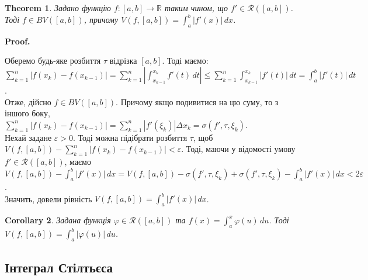 \documentclass[a4paper, 10pt]{article}
\makeatletter
\def\qed{$\blacksquare$}
\theoremstyle{theoremdd}
\newtheorem{theorem}{Theorem}[subsection]
\theoremstyle{theoremdd}
\theoremstyle{theoremdd}
\theoremstyle{theoremdd}
\theoremstyle{theoremdd}
\theoremstyle{theoremdd}
\theoremstyle{theoremdd}
\theoremstyle{theoremdd}
\theoremstyle{theoremdd}
\newtheorem{corollary}[theorem]{Corollary}
\renewenvironment{proof}[1][Proof.\\]{\par
\pushQED{\hfill \qed}%
\normalfont \topsep6\p@\@plus6\p@\relax
\trivlist
\item\relax
{\bfseries
#1\@addpunct{.}}\hspace\labelsep\ignorespaces
}{%
\popQED\endtrivlist\@endpefalse
}
\makeatother
\begin{document}
\begin{theorem}
\label{differentiable_integrable_is_bounded_variation}
Задано функцію $f \colon [a,b] \to \mathbb{R}$ таким чином, що $f' \in \mathcal{R}([a,b])$. Тоді $f \in BV([a,b])$, причому $V(f,[a,b]) = \displaystyle\int_a^b |f'(x)|\,dx$.
\end{theorem}

\begin{proof}
Оберемо будь-яке розбиття $\tau$ відрізка $[a,b]$. Тоді маємо:\\
$\displaystyle\sum_{k=1}^n |f(x_k) - f(x_{k-1})| = \sum_{k=1}^n \left|\int_{x_{k-1}}^{x_k} f'(t)\,dt \right| \leq \sum_{k=1}^n \int_{x_{k-1}}^{x_k} |f'(t)|\,dt = \int_a^b |f'(t)|\,dt$.\\
Отже, дійсно $f \in BV([a,b])$. Причому якщо подивитися на цю суму, то з іншого боку,\\
$\displaystyle\sum_{k=1}^n |f(x_k) - f(x_{k-1})| = \sum_{k=1}^n |f'(\xi_k)| \Delta x_k = \sigma(f',\tau,\xi_k)$.\\
Нехай задане $\varepsilon > 0$. Тоді можна підібрати розбиття $\tau$, щоб $V(f,[a,b]) - \displaystyle\sum_{k=1}^n |f(x_k) - f(x_{k-1})| < \varepsilon$. Тоді, маючи у відомості умову $f' \in \mathcal{R}([a,b])$, маємо\\
$V(f,[a,b]) - \displaystyle\int_a^b |f'(x)|\,dx = V(f,[a,b]) - \sigma(f',\tau,\xi_k) + \sigma(f',\tau,\xi_k) - \displaystyle\int_a^b |f'(x)|\,dx < 2\varepsilon$.\\
Значить, довели рівність $V(f,[a,b]) = \displaystyle\int_a^b |f'(x)|\,dx$.
\end{proof}

\begin{corollary}
Задана функція $\varphi \in \mathcal{R}([a,b])$ та $f(x) = \displaystyle\int_a^x \varphi(u)\,du$. Тоді $V(f,[a,b]) = \displaystyle\int_a^b |\varphi(u)|\,du$.
\end{corollary}

\subsection{Інтеграл Стілтьєса}
\end{document}

